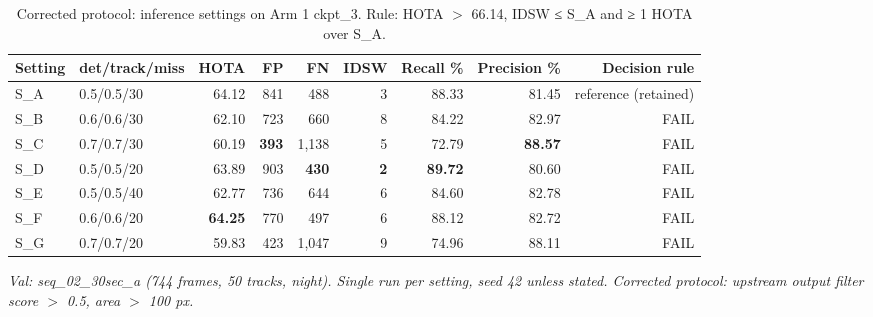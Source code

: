 \begin{table}[t]
\centering
\small
\caption{Corrected protocol: inference settings on Arm 1 ckpt\_3. Rule: HOTA $>$ 66.14, IDSW ≤ S\_A and ≥ 1 HOTA over S\_A.}
\begin{tabular}{llrrrrrrr}
\toprule
Setting & det/track/miss & HOTA & FP & FN & IDSW & Recall \% & Precision \% & Decision rule \\
\midrule
S\_A & 0.5/0.5/30 & 64.12 & 841 & 488 & 3 & 88.33 & 81.45 & reference (retained) \\
S\_B & 0.6/0.6/30 & 62.10 & 723 & 660 & 8 & 84.22 & 82.97 & FAIL \\
S\_C & 0.7/0.7/30 & 60.19 & \textbf{393} & 1,138 & 5 & 72.79 & \textbf{88.57} & FAIL \\
S\_D & 0.5/0.5/20 & 63.89 & 903 & \textbf{430} & \textbf{2} & \textbf{89.72} & 80.60 & FAIL \\
S\_E & 0.5/0.5/40 & 62.77 & 736 & 644 & 6 & 84.60 & 82.78 & FAIL \\
S\_F & 0.6/0.6/20 & \textbf{64.25} & 770 & 497 & 6 & 88.12 & 82.72 & FAIL \\
S\_G & 0.7/0.7/20 & 59.83 & 423 & 1,047 & 9 & 74.96 & 88.11 & FAIL \\
\bottomrule
\end{tabular}
\par\smallskip\footnotesize\emph{Val: seq\_02\_30sec\_a (744 frames, 50 tracks, night). Single run per setting, seed 42 unless stated. Corrected protocol: upstream output filter score $>$ 0.5, area $>$ 100 px.}
\end{table}
